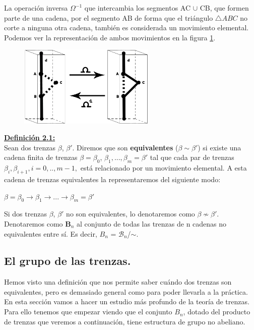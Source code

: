 \documentclass[14pt]{extarticle}
\begin{document}
La operación inversa $ \Omega^{-1} $ que intercambia los segmentos AC $\cup$  CB, que formen parte de una cadena, por el segmento AB de forma que el triángulo $\triangle ABC$ no corte a ninguna otra cadena, también es considerada un movimiento elemental. \\
Podemos ver la representación de ambos movimientos en la figura \ref{elem}.\\
\begin{figure}[h!]
	\centering
	\includegraphics[width=6.5cm]{itrenzas/elemental.png}
	\caption{}
	\label{elem} 
\end{figure}


\textbf{\underline{Definición 2.1:}}\label{defequi}\\
Sean dos trenzas $\beta$, $\beta'$. Diremos que son \textbf{equivalentes} ($\beta \sim \beta'$) si existe una cadena finita de trenzas $ \beta = \beta_{0}$, $\beta_{1},...,\beta_{m}=\beta'$ tal que cada par de trenzas $ \beta_{i}, \beta_{i+1}, i=0,..,m-1, $ está relacionado por un movimiento elemental. A esta cadena de trenzas equivalentes la representaremos del siguiente modo:
\begin{center}
	$ \beta = \beta_{0} \rightarrow \beta_{1} \rightarrow ... \rightarrow \beta_{m}=\beta'$
\end{center}

Si dos trenzas $\beta$, $\beta'$ no son equivalentes, lo denotaremos como $\beta \not \sim \beta'$.\\

Denotaremos como $ \textbf{B}_{n} $ al conjunto de todas las trenzas de n cadenas no equivalentes entre sí. Es decir, ${B}_{n}$ = $\mathscr{B}_{n}$/$ \sim $.\\

\newpage
\subsection{El grupo de las trenzas.}\label{grupotrenzas}
Hemos visto una definición que nos permite saber cuándo dos trenzas son equivalentes, pero es demasiado general como para poder llevarla a la práctica. En esta sección vamos a hacer un estudio más profundo de la teoría de trenzas. Para ello tenemos que empezar viendo que el conjunto ${B}_{n}$, dotado del producto de trenzas que veremos a continuación, tiene estructura de grupo no abeliano.
\end{document}

